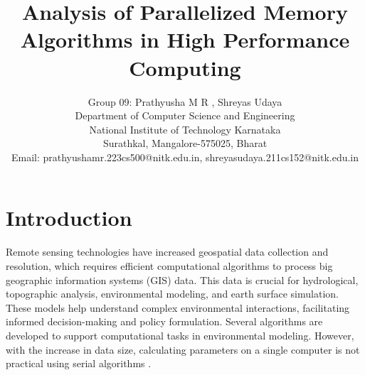 \documentclass[journal, a4paper]{IEEEtran}
\begin{document}
	
	\title{Analysis of Parallelized Memory Algorithms in High Performance Computing}
	


	\author{Group 09: Prathyusha M R , Shreyas Udaya	\\Department of Computer Science and Engineering \\ National Institute of Technology Karnataka\\ Surathkal, Mangalore-575025, Bharat \\ Email: prathyushamr.223cs500@nitk.edu.in, shreyasudaya.211cs152@nitk.edu.in}
	

	\maketitle
	

		
		
	
	
	
	
	
	
	
	
	\IEEEpeerreviewmaketitle
	
	
	
	
	\maketitle
	
	\thispagestyle{empty}
	\section{Introduction}

	Remote sensing technologies have increased geospatial data collection and resolution, which requires efficient computational algorithms to process big geographic information systems (GIS) data. This data is crucial for hydrological, topographic analysis, environmental modeling, and earth surface simulation. These models help understand complex environmental interactions, facilitating informed decision-making and policy formulation. Several algorithms are developed to support computational tasks in environmental modeling. However, with the increase in data size, calculating parameters on a single computer is not practical using serial algorithms \cite{CHO2023105771,KOTYRA2023105728}.
	
\end{document}
